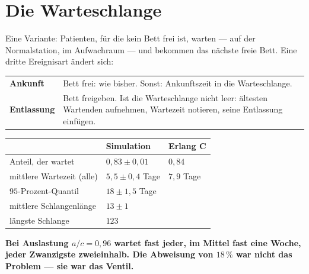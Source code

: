 \section{Die Warteschlange}

\begin{merksatz}
Eine Variante: Patienten, für die kein Bett frei ist, warten --- auf der Normalstation, im Aufwachraum --- und bekommen das nächste freie Bett. Eine dritte Ereignisart ändert sich:

\begin{center}
{\small
\renewcommand{\arraystretch}{1.5}
\begin{tabular}{@{}P{2.2cm}P{6.6cm}@{}}
\toprule
\textbf{Ankunft} & Bett frei: wie bisher. Sonst: Ankunftszeit in die Warteschlange.\\
\textbf{Entlassung} & Bett freigeben. Ist die Warteschlange nicht leer: ältesten Wartenden aufnehmen, Wartezeit notieren, seine Entlassung einfügen.\\
\bottomrule
\end{tabular}}
\end{center}

\begin{center}
{\small
\renewcommand{\arraystretch}{1.48}
\begin{tabular}{@{}P{4.2cm}P{2.4cm}P{2.2cm}@{}}
\toprule
& \textbf{Simulation} & \textbf{Erlang C}\\
\midrule
Anteil, der wartet & $0{,}83 \pm 0{,}01$ & $0{,}84$\\
mittlere Wartezeit (alle) & $5{,}5 \pm 0{,}4$ Tage & $7{,}9$ Tage\\
$95$-Prozent-Quantil & $18 \pm 1{,}5$ Tage & \\
mittlere Schlangenlänge & $13 \pm 1$ & \\
längste Schlange & $123$ & \\
\bottomrule
\end{tabular}}
\end{center}

\begin{center}
\begin{minipage}{0.9\textwidth}
\textbf{Bei Auslastung $a/c = 0{,}96$ wartet fast jeder, im Mittel fast eine Woche, jeder Zwanzigste zweieinhalb. Die Abweisung von $18\,\%$ war nicht das Problem --- sie war das Ventil.}
\end{minipage}
\end{center}


\end{merksatz}
